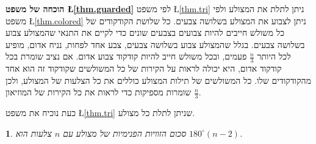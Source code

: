 \documentclass[12pt,a4paper]{article}
\newtheorem{theorem}{\R{משפט}}
\begin{document}
\begin{center}
\end{center}


\textbf{הוכחה של משפט
\L{\ref{thm.guarded}}}
לפי משפט
\L{\ref{thm.tri}}
ניתן לתלת את המצולע ולפי משפט
\L{\ref{thm.colored}}
ניתן לצבוע את המצולע בשלושה צבעים. כל שלושת הקודקודים של כל משולש חייבים להיות צבועים בצבעים שונים כדי לקיים את התנאי שהמצולע צבוע בשלושה צבעים. בגלל שהמצולע צבוע בשלושה צבעים, צבע אחד לפחות, נניח אדום, מופיע לכל היותר
$\frac{n}{3}$
פעמים, ובכל משולש חייב להיות קודקוד צבוע אדום. אם נציב שומרת בכל קודקוד אדום, היא יכולה לראות על הקירות של כל המשולשים שקודקוד זה הוא אחד מהקודקודים שלו. כל המשולשים של תילות המצולע כוללים את כל הצלעות של המצולע, ולכן
$\frac{n}{3}$
שומרות מספיקות כדי לראות את כל הקירות של המוזיאון.

\newpage

כעת נוכיח את משפט
\L{\ref{thm.tri}}
שניתן לתלת כל מצולע.

\begin{theorem}
סכום הזוויות הפנימיות של מצולע עם
$n$
צלעות הוא
$180^\circ(n-2)$.
\end{theorem}
\end{document}
